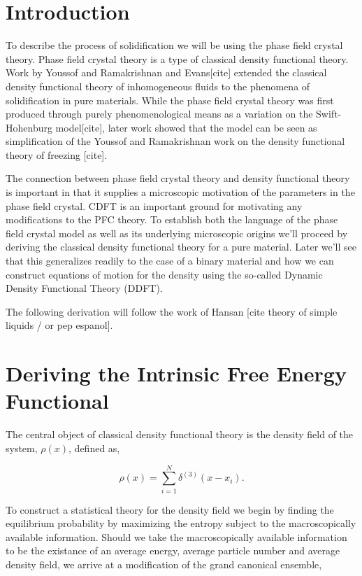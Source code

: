 \section{Introduction}
To describe the process of solidification we will be using the phase field crystal theory. Phase field crystal theory is a type of classical density functional theory. Work by Youssof and Ramakrishnan\cite{YR1979} and Evans[cite] extended the classical density functional theory of inhomogeneous fluids to the phenomena of solidification in pure materials. While the phase field crystal theory was first produced through purely phenomenological means as a variation on the Swift-Hohenburg model[cite], later work showed that the model can be seen as simplification of the Youssof and Ramakrishnan work on the density functional theory of freezing [cite]. 

The connection between phase field crystal theory and density functional theory is important in that it supplies a microscopic motivation of the parameters in the phase field crystal. CDFT is an important ground for motivating any modifications to the PFC theory. To establish both the language of the phase field crystal model as well as its underlying microscopic origins we'll proceed by deriving the classical density functional theory for a pure material. Later we'll see that this generalizes readily to the case of a binary material and how we can construct equations of motion for the density using the so-called Dynamic Density Functional Theory (DDFT). 

The following derivation will follow the work of Hansan [cite theory of simple liquids / or pep espanol].

\section{Deriving the Intrinsic Free Energy Functional}

The central object of classical density functional theory is the density field of the system, $\rho(x)$, defined as, 

\begin{equation}
    \rho(x) = \sum_{i=1}^N \delta^{(3)}(x - x_i).
\end{equation}

To construct a statistical theory for the density field we begin by finding the equilibrium probability by maximizing the entropy subject to the macroscopically available information. Should we take the macroscopically available information to be the existance of an average energy, average particle number and average density field, we arrive at a modification of the grand canonical ensemble, 


